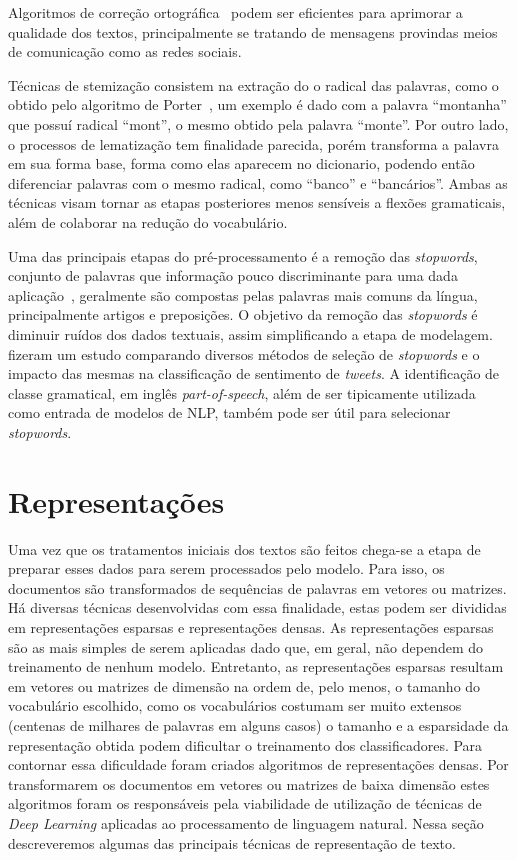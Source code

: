 Algoritmos de correção ortográfica~\cite{damerau64}\cite{navarro01} podem ser
eficientes para aprimorar a qualidade dos textos, principalmente se tratando de
mensagens provindas meios de comunicação como as redes sociais.

Técnicas de stemização consistem na extração do o radical das palavras,
como o obtido pelo algoritmo de Porter~\cite{porter80}, um exemplo é dado com a
palavra ``montanha'' que possuí radical ``mont'', o mesmo obtido pela palavra
``monte''.
Por outro lado, o processos de lematização tem finalidade parecida, porém
transforma a palavra em sua forma base, forma como elas aparecem no dicionario,
podendo então diferenciar palavras com o mesmo radical, como ``banco'' e
``bancários''.
Ambas as técnicas visam tornar as etapas posteriores menos sensíveis a flexões
gramaticais, além de colaborar na redução do vocabulário.

Uma das principais etapas do pré-processamento é a remoção das
\textit{stopwords}, conjunto de palavras que informação pouco discriminante
para uma dada aplicação~\cite{lo05}, geralmente são compostas pelas palavras
mais comuns da língua, principalmente artigos e preposições.
O objetivo da remoção das \textit{stopwords} é diminuir ruídos dos dados
textuais, assim simplificando a etapa de modelagem.
\citet{saif14} fizeram um estudo comparando diversos métodos de seleção de
\textit{stopwords} e o impacto das mesmas na classificação de sentimento de
\textit{tweets}.
A identificação de classe gramatical, em inglês \textit{part-of-speech}, além de
ser tipicamente utilizada como entrada de modelos de NLP, também pode ser útil
para selecionar \textit{stopwords}.

\section{Representações}

Uma vez que os tratamentos iniciais dos textos são feitos chega-se a etapa de
preparar esses dados para serem processados pelo modelo.
Para isso, os documentos são transformados de sequências de palavras em vetores
ou matrizes.
Há diversas técnicas desenvolvidas com essa finalidade, estas podem ser
divididas em representações esparsas e representações densas.
As representações esparsas são as mais simples de serem aplicadas dado que, em
geral, não dependem do treinamento de nenhum modelo.
Entretanto, as representações esparsas resultam em vetores ou matrizes de
dimensão na ordem de, pelo menos, o tamanho do vocabulário escolhido, como os
vocabulários costumam ser muito extensos (centenas de milhares de palavras em
alguns casos) o tamanho e a esparsidade da representação obtida podem dificultar
o treinamento dos classificadores.
Para contornar essa dificuldade foram criados algoritmos de representações
densas.
Por transformarem os documentos em vetores ou matrizes de baixa dimensão estes
algoritmos foram os responsáveis pela viabilidade de utilização de técnicas de
\textit{Deep Learning} aplicadas ao processamento de linguagem natural.
Nessa seção descreveremos algumas das principais técnicas de representação de
texto.

